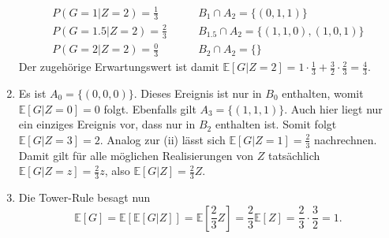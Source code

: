 \documentclass[a4paper]{article}
\begin{document}
\begin{enumerate}
\begin{align*}
        P(G = 1 | Z = 2) = \frac{1}{3} & \qquad B_{1} \cap A_2= \{(0,1,1)\}\\
        P(G = 1.5 | Z = 2) = \frac{2}{3} & \qquad B_{1.5} \cap A_2= \{(1,1,0), (1,0,1)\}\\
        P(G = 2 | Z = 2) = \frac{0}{3} & \qquad B_2 \cap A_2= \{\}
    \end{align*}
    Der zugehörige Erwartungswert ist damit $\mathds{E}[G | Z = 2] = 1 \cdot \frac{1}{3} + \frac{3}{2} \cdot \frac{2}{3} = \frac{4}{3}$.
    \item Es ist $A_0 = \{(0,0,0)\}$. Dieses Ereignis ist nur in $B_{0}$ enthalten, womit $\mathds{E}[G|Z=0] = 0$ folgt.
    Ebenfalls gilt $A_3 = \{(1,1,1)\}$. Auch hier liegt nur ein einziges Ereignis vor, dass nur in $B_{2}$ enthalten ist. Somit folgt $\mathds{E}[G | Z = 3] = 2$.
    Analog zur (ii) lässt sich $\mathds{E}[G|Z=1] = \frac{2}{3}$ nachrechnen. Damit gilt für alle möglichen Realisierungen von $Z$ tatsächlich $\mathds{E}[G|Z = z] = \frac{2}{3} z$, also $\mathds{E}[G|Z] = \frac{2}{3}Z$.
    \item Die Tower-Rule besagt nun 
    \begin{equation*}
        \mathds{E}[G] = \mathds{E}[\mathds{E}[G|Z]] = \mathds{E}[\frac{2}{3}Z] = \frac{2}{3} \mathds{E}[Z] = \frac{2}{3} \cdot \frac{3}{2} = 1\text{.}
    \end{equation*}
\end{enumerate}

\subsection{}

\newcommand{\var}{\mathds{V}\mathrm{ar}}
\end{document}
